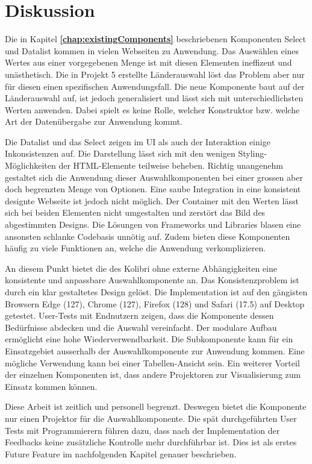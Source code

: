 \chapter{Diskussion}
\label{chap:discussion}

Die in Kapitel \textbf{\ref{chap:existingComponents}} beschriebenen Komponenten Select und Datalist kommen in vielen Webseiten zu Anwendung. 
Das Auswählen eines Wertes aus einer vorgegebenen Menge ist mit diesen Elementen ineffizent und unästhetisch. 
Die in Projekt 5 erstellte Länderauswahl löst das Problem aber nur für diesen einen spezifischen Anwendungsfall. 
Die neue Komponente  baut auf der Länderauswahl auf, ist jedoch generalisiert und lässt sich mit unterschiedlichsten Werten anwenden. 
Dabei spielt es keine Rolle, welcher Konstruktor bzw. welche Art der Datenübergabe zur Anwendung kommt. 

Die Datalist und das Select zeigen im UI als auch der Interaktion einige Inkonsistenzen auf. 
Die Darstellung lässt sich mit den wenigen Styling-Möglichkeiten der HTML-Elemente teilweise beheben. 
Richtig unangenehm gestaltet sich die Anwendung dieser Auswahlkomponenten bei einer grossen aber doch begrenzten Menge von Optionen. 
Eine saube Integration in eine konsistent designte Webseite ist jedoch nicht möglich. 
Der Container mit den Werten lässt sich bei beiden Elementen nicht umgestalten und zerstört das Bild des abgestimmten Designs. 
Die Lösungen von Frameworks und Libraries blasen eine ansonsten schlanke Codebasis unnötig auf. 
Zudem bieten diese Komponenten häufig zu viele Funktionen an, welche die Anwendung verkomplizieren. 

An diesem Punkt bietet die  des Kolibri ohne externe Abhängigkeiten eine konsistente und anpassbare Auswahlkomponente an. 
Das Konsistenzproblem ist durch ein klar gestaltetes Design gelöst. 
Die Implementation ist auf den gängisten Browsern Edge (127), Chrome (127), Firefox (128) und Safari (17.5) auf Desktop getestet. 
User-Tests mit Endnutzern zeigen, dass die Komponente dessen Bedürfnisse abdecken und die Auswahl vereinfacht. 
Der modulare Aufbau ermöglicht eine hohe Wiederverwendbarkeit. 
Die Subkomponente  kann für ein Einsatzgebiet ausserhalb der Auswahlkomponente zur Anwendung kommen. 
Eine mögliche Verwendung kann bei einer Tabellen-Ansicht sein. 
Ein weiterer Vorteil der einzelnen Komponenten ist, dass andere Projektoren zur Visualisierung zum Einsatz kommen können. 

Diese Arbeit ist zeitlich und personell begrenzt. 
Deswegen bietet die Komponente nur einen Projektor für die Auswahlkomponente. 
Die spät durchgeführten User Tests mit Programmierern führen dazu, dass nach der Implementation der Feedbacks keine zusätzliche Kontrolle mehr durchführbar ist. 
Dies ist als erstes Future Feature im nachfolgenden Kapitel genauer beschrieben. 


